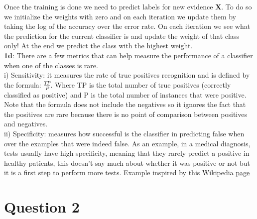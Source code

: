\documentclass[11pt]{article}
\begin{document}
Once the training is done we need to predict labels for new evidence \textbf{X}. To do so we initialize the weights with zero and on each iteration we update them by taking the log of the accuracy over the error rate. On each iteration we see what the prediction for the current classifier is and update the weight of that class only! At the end we predict the class with the highest weight.\\

\textbf{1d}: There are a few metrics that can help measure the performance of a classifier when one of the classes is rare.\\

i) Sensitivity: it measures the rate of true positives recognition and is defined by the formula: $\frac{TP}{P}$. Where TP is the total number of true positives (correctly classified as positive) and P is the total number of instances that were positive. Note that the formula does not include the negatives so it ignores the fact that the positives are rare because there is no point of comparison between positives and negatives.\\

ii) Specificity: measures how successful is the classifier in predicting false when over the examples that were indeed false. As an example, in a medical diagnosis, tests usually have high specificity, meaning that they rarely predict a positive in healthy patients, this doesn't say much about whether it was positive or not but it is a first step to perform more tests. Example inspired by this Wikipedia \href{https://en.wikipedia.org/wiki/Sensitivity_and_specificity#Sensitivity}{page}

\section*{Question 2}
\end{document}
